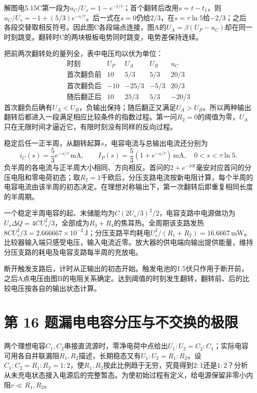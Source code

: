 \documentclass[UTF8,fontset=fandol,a4paper,11pt]{ctexart}
\begin{document}
解图电5.15C第一段为$u_C/U_s=1-e^{-t/\tau}$；首个翻转后改用$s=t-t_1$，则$u_C/U_s=-1+(5/3)e^{-s/\tau}$。后一式在$s=0$仍给$2/3$，在$s=\tau\ln5$给$-2/3$；之后各段交替取相反符号。因此图C各段端点连接，图A的$U_A=\beta(U_P-u_C)$却在同一时刻跳变。翻转时C的两块极板电势同时跳变，电势差保持连续。

把前两次翻转处的量列全，表中电压均以伏为单位：
\[
\begin{array}{c|rrrr}
\text{时刻}&U_P&U_A&U_B&u_C\\ \hline
\text{首次翻负前}&10&5/3&5/3&20/3\\
\text{首次翻负后}&-10&-25/3&-5/3&20/3\\
\text{随后翻正后}&10&25/3&5/3&-20/3
\end{array}
\]
首次翻负后确有$U_A<U_B$，负输出保持；随后翻正又满足$U_A>U_B$。所以两种输出翻转后都进入一段满足相应比较条件的指数过程。第一问$R_2=0$的阈值为零，$U_A$只在无限时间才逼近它，有限时刻没有同样的反向过程。

稳定后任一正半周，从翻转起算$s$，电容电流与总输出电流还分别为
\[
i_C(s)=\frac53e^{-s/\tau}\,\mathrm{mA},\qquad
I_P(s)=\frac53(1+e^{-s/\tau})\,\mathrm{mA},\quad 0<s<\tau\ln5.
\]
负半周的各电流与正半周大小相同、方向相反。首问的$2+e^{-10t}$毫安对应首问的分压电阻和零电荷初态；取$R_2=1$千欧后，分压支路电流按新电阻计算，每个半周的电容电流由该半周的初态决定。在理想对称输出下，第一次翻转后即重复相同长度的半周期。

一个稳定半周电容的起、末储能均为$C(2U_s/3)^2/2$，电容支路中电源做功为$U_s\Delta Q=4CU_s^2/3$，全部成为$R_3+R_4$的焦耳热。全周期该支路发热$8CU_s^2/3=2.666667\times10^{-3}\,\mathrm J$；分压支路平均耗电$U_s^2/(R_1+R_2)=16.6667\,\mathrm{mW}$。比较器输入端只感受电压，输入电流近零。放大器的供电端向输出提供能量，维持分压支路的耗电及电容支路每半周的充放电。

断开触发支路后，计时从正输出的初态开始。触发电池的1.5伏只作用于断开前，之后A点电压由图B的电阻关系确定。达到阈值的时刻发生翻转，翻转前、后的比较电压按各自的输出状态计算。




\section*{第 16 题\quad 漏电电容分压与不交换的极限}\label{q:16}


两个理想电容$C_1,C_2$串接直流源时，零净电荷中点给出$U_1:U_2=C_2:C_1$；实际电容可用各自并联漏阻$R_1,R_2$描述，长期稳态又有$U_1:U_2=R_1:R_2$。设$C_1:C_2=R_1:R_2=1:2$，使$R_1,R_2$按此比例趋于无穷，究竟得到$2:1$还是$1:2$？分析从未充电状态接入电源后的完整暂态。为使初始过程有定义，给电源保留非零小内阻$r\ll R_1,R_2$。
\end{document}
